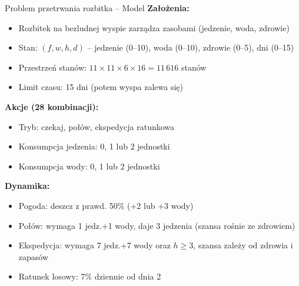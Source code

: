 \begin{frame}{Problem przetrwania rozbitka -- Model}
\textbf{Założenia:}
\begin{itemize}
    \item Rozbitek na bezludnej wyspie zarządza zasobami (jedzenie, woda, zdrowie)
    \item Stan: $(f, w, h, d)$ -- jedzenie (0--10), woda (0--10), zdrowie (0--5), dni (0--15)
    \item Przestrzeń stanów: $11 \times 11 \times 6 \times 16 = 11\,616$ stanów
    \item Limit czasu: 15 dni (potem wyspa zalewa się)
\end{itemize}

\vspace{0.3em}
\textbf{Akcje (28 kombinacji):}
\begin{itemize}
    \item Tryb: czekaj, połów, ekspedycja ratunkowa
    \item Konsumpcja jedzenia: 0, 1 lub 2 jednostki
    \item Konsumpcja wody: 0, 1 lub 2 jednostki
\end{itemize}

\vspace{0.3em}
\textbf{Dynamika:}
\begin{itemize}
    \item Pogoda: deszcz z prawd. 50\% (+2 lub +3 wody)
    \item Połów: wymaga 1 jedz.+1 wody, daje 3 jedzenia (szansa rośnie ze zdrowiem)
    \item Ekspedycja: wymaga 7 jedz.+7 wody oraz $h \geq 3$, szansa zależy od zdrowia i zapasów
    \item Ratunek losowy: 7\% dziennie od dnia 2
\end{itemize}
\end{frame}

